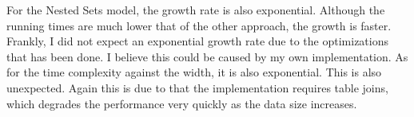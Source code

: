 For the Nested Sets model, the growth rate is also exponential. Although the running times are much lower that of the other approach, the growth is faster. Frankly, I did not expect an exponential growth rate due to the optimizations that has been done. I believe this could be caused by my own implementation. As for the time complexity against the width, it is also exponential. This is also unexpected. Again this is due to that the implementation requires table joins, which degrades the performance very quickly as the data size increases.